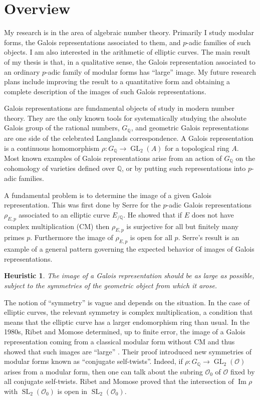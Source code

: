 \documentclass[12pt]{article}
\newcommand{\OK}{\ensuremath{\mathcal{O}}}
\newcommand{\Q}{\mathbb{Q}}
\newtheorem*{heuristic}{Heuristic}
\theoremstyle{definition}
\DeclareMathOperator{\GL}{GL}
\DeclareMathOperator{\im}{Im}
\DeclareMathOperator{\SL}{SL}
\begin{document}
\section*{Overview}
My research is in the area of algebraic number theory.  Primarily I study modular forms, the Galois representations associated to them, and $p$-adic families of such objects.  I am also interested in the arithmetic of elliptic curves.  The main result of my thesis is that, in a qualitative sense, the Galois representation associated to an ordinary $p$-adic family of modular forms has ``large'' image.  My future research plans include improving the result to a quantitative form and obtaining a complete description of the images of such Galois representations.  

Galois representations are fundamental objects of study in modern number theory.  They are the only known tools for systematically studying the absolute Galois group of the rational numbers, $G_\Q$, and geometric Galois representations are one side of the celebrated Langlands correspondence.  A Galois representation is a continuous homomorphism $\rho : G_\Q \to \GL_2(A)$ for a topological ring $A$.  Most known examples of Galois representations arise from an action of $G_\Q$ on the cohomology of varieties defined over $\Q$, or by putting such representations into $p$-adic families.  

A fundamental problem is to determine the image of a given Galois representation.  This was first done by Serre \cite{Serre68} for the $p$-adic Galois representations $\rho_{E, p}$ associated to an elliptic curve $E_{/\Q}$.  He showed that if $E$ does not have complex multiplication (CM) then $\rho_{E, p}$ is surjective for all but finitely many primes $p$.  Furthermore the image of $\rho_{E, p}$ is open for all $p$.  Serre's result is an example of a general pattern governing the expected behavior of images of Galois representations.

\begin{heuristic}
The image of a Galois representation should be as large as possible, subject to the symmetries of the geometric object from which it arose.
\end{heuristic}

The notion of ``symmetry'' is vague and depends on the situation.  In the case of elliptic curves, the relevant symmetry is complex multiplication, a condition that means that the elliptic curve has a larger endomorphism ring than usual.  In the 1980s, Ribet and Momose determined, up to finite error, the image of a Galois representation coming from a classical modular form without CM and thus showed that such images are ``large'' \cite{Momose81, Ribet83}.  Their proof introduced new symmetries of modular forms known as ``conjugate self-twists''.  Indeed, if $\rho: G_\Q \to \GL_2(\OK)$ arises from a modular form, then one can talk about the subring $\OK_0$ of $\OK$ fixed by all conjugate self-twists.  Ribet and Momose proved that the intersection of $\im \rho$ with $\SL_2(\OK_0)$ is open in $\SL_2(\OK_0)$.    
\end{document}
